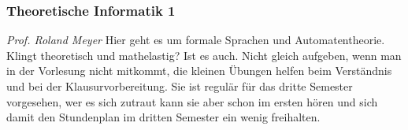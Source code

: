 
\subsubsection{Theoretische Informatik 1}
	\textit{Prof. Roland Meyer}
	Hier geht es um formale Sprachen und Automatentheorie. Klingt theoretisch und mathelastig? Ist es auch. Nicht gleich aufgeben, wenn man in der Vorlesung nicht mitkommt, die kleinen Übungen helfen beim Verständnis und bei der Klausurvorbereitung. Sie ist regulär für das dritte Semester vorgesehen, wer es sich zutraut kann sie aber schon im ersten hören und sich damit den Stundenplan im dritten Semester ein wenig freihalten. 